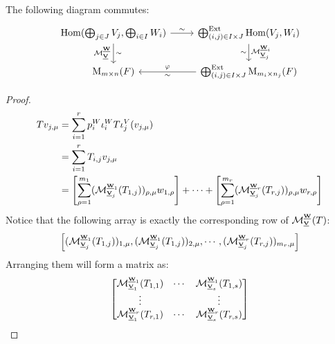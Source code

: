 \begin{theorem}
    The following diagram commutes:
    \[
        \begin{tikzcd}
            \Hom(\bigoplus_{j \in J}V_j, \bigoplus_{i \in I}W_i) \arrow[r, "\sim"]  \arrow[d, "\calM^{\bs{W}{}}_{\bs{V}{}}"', "\sim"]
            & \bigoplus^{\Ext}_{(i, j) \in I \times J} \Hom(V_j, W_i) \arrow[d, "\calM^{\bs{W}{i}}_{\bs{V}{j}}", "\sim"']
            \\
            \Mat_{m \times n}(F)
            & \bigoplus^{\Ext}_{(i, j) \in I \times J} \Mat_{m_i \times n_j}(F)  \arrow[l, "\varphi"', "\sim"]
        \end{tikzcd}
    \]
\end{theorem}
\begin{proof}
    \begin{equation*}
        \begin{aligned}
            T v_{j, \mu} &= \sum_{i=1}^r p_i^W \iota_i^W T \iota_j^V (v_{j, \mu}) \\
            &= \sum_{i=1}^r T_{i,j} v_{j, \mu} \\
            &= \left[ \sum_{\rho=1}^{m_1} (\calM^{\bs{W}{1}}_{\bs{V}{j}}(T_{1,j}))_{\rho, \mu} w_{1, \rho} \right] + \cdots + \left[ \sum_{\rho=1}^{m_r} (\calM^{\bs{W}{r}}_{\bs{V}{j}}(T_{r,j}))_{\rho, \mu} w_{r, \rho} \right] \\
        \end{aligned}
    \end{equation*}
    Notice that the following array is exactly the corresponding row of $\calM^{\bs{W}{}}_{\bs{V}{}}(T)$:
    \begin{equation*}
        \begin{bmatrix}
            (\calM^{\bs{W}{1}}_{\bs{V}{j}}(T_{1,j}))_{1, \mu}, (\calM^{\bs{W}{1}}_{\bs{V}{j}}(T_{1,j}))_{2, \mu}, \cdots, (\calM^{\bs{W}{r}}_{\bs{V}{j}}(T_{r,j}))_{m_r, \mu}
        \end{bmatrix}
    \end{equation*}
    Arranging them will form a matrix as:
    \begin{equation*}
        \begin{bmatrix}
            \calM^{\bs{W}{1}}_{\bs{V}{1}}(T_{1,1}) & \cdots & \calM^{\bs{W}{1}}_{\bs{V}{s}}(T_{1,s}) \\
            \vdots & & \vdots \\
            \calM^{\bs{W}{r}}_{\bs{V}{1}}(T_{r,1}) & \cdots & \calM^{\bs{W}{r}}_{\bs{V}{s}}(T_{r,s})
        \end{bmatrix}
    \end{equation*}
\end{proof}


